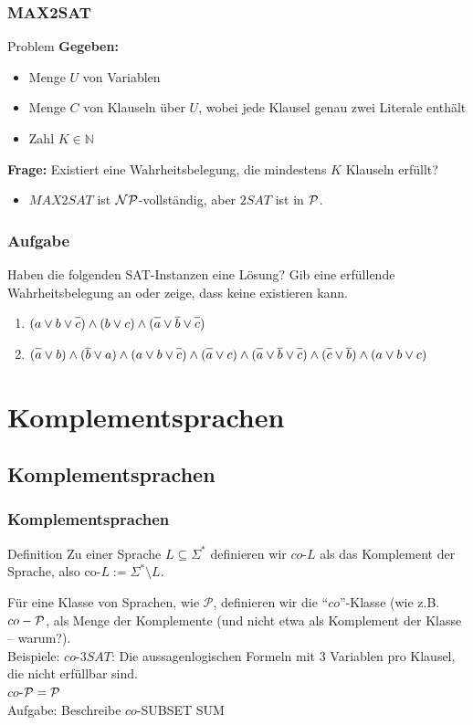 \begin{frame}
\frametitle{MAX2SAT}
\begin{block}{Problem}
\textbf{Gegeben:}
\begin{itemize}
 \item Menge $U$ von Variablen
 \item Menge $C$ von Klauseln über $U$, wobei jede Klausel genau zwei Literale enthält
 \item Zahl $K \in \mathbb{N}$
\end{itemize}
\textbf{Frage:} Existiert eine Wahrheitsbelegung, die mindestens $K$ Klauseln erfüllt?
\end{block}

\begin{itemize}
	\item $MAX2SAT$ ist $\mathcal{NP}$-vollständig, aber $2SAT$ ist in $\mathcal{P}$.
\end{itemize}
\end{frame}

\begin{frame}
	\frametitle{Aufgabe}
	
	Haben die folgenden SAT-Instanzen eine Lösung? Gib eine erfüllende Wahrheitsbelegung an oder zeige, dass keine existieren kann.
\begin{enumerate}
 \item $(a \vee b \vee \neglit{c}) \wedge (b \vee c) \wedge  (\neglit{a} \vee \neglit{b} \vee \neglit{c})$
 \item $(\neglit{a} \vee b) \wedge (\neglit{b} \vee  a) \wedge (a \vee b \vee \neglit{c}) \wedge (\neglit{a} \vee c)  \wedge  (\neglit{a} \vee \neglit{b} \vee \neglit{c}) \wedge (\neglit{c} \vee \neglit{b}) \wedge (a \vee b \vee c)$
\end{enumerate}
\end{frame}

\section{Komplementsprachen}
\subsection{Komplementsprachen}
\begin{frame}
\frametitle{Komplementsprachen}
\begin{block}{Definition}
Zu einer Sprache $L \subseteq \Sigma^*$ definieren wir $co$-$L$ als das Komplement der Sprache, also
$\mbox{co-}L := \Sigma^*\setminus L$.
\end{block}
Für eine Klasse von Sprachen, wie $\mathcal{P}$, definieren wir die "`$co$"'-Klasse (wie z.B. $co-\mathcal{P}$, als Menge der Komplemente (und nicht etwa als Komplement der Klasse -- warum?).\\[8pt]
Beispiele: $co$-$3SAT$: Die aussagenlogischen Formeln mit 3 Variablen pro Klausel, die nicht erfüllbar sind.\\
$co$-$\mathcal{P} = \mathcal{P}$\\[8pt]
Aufgabe: Beschreibe $co$-SUBSET SUM
\end{frame}

